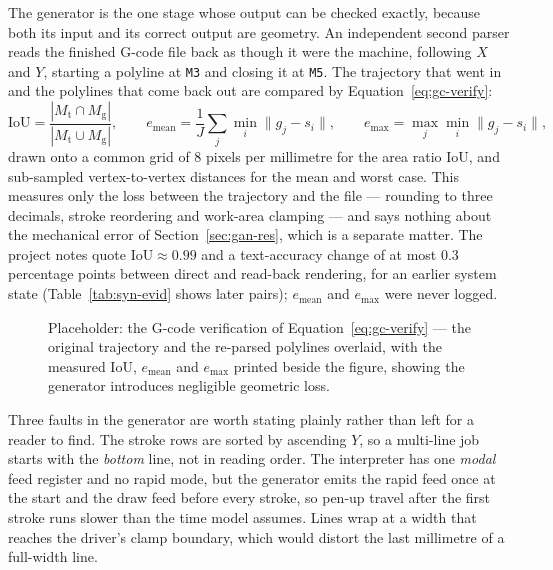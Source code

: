 \label{sec:gc-verify}
The generator is the one stage whose output can be checked exactly, because both its input and its correct output are geometry. An independent second parser reads the finished G-code file back as though it were the machine, following $X$ and $Y$, starting a polyline at \texttt{M3} and closing it at \texttt{M5}. The trajectory that went in and the polylines that come back out are compared by Equation~\ref{eq:gc-verify}:
\begin{equation}
\mathrm{IoU}=\frac{|M_{\mathrm t}\cap M_{\mathrm g}|}{|M_{\mathrm t}\cup M_{\mathrm g}|},\qquad e_{\mathrm{mean}}=\frac{1}{J}\sum_j\min_i\lVert g_j-s_i\rVert,\qquad e_{\max}=\max_j\min_i\lVert g_j-s_i\rVert,
\label{eq:gc-verify}
\end{equation}
drawn onto a common grid of 8 pixels per millimetre for the area ratio $\mathrm{IoU}$, and sub-sampled vertex-to-vertex distances for the mean and worst case. This measures only the loss between the trajectory and the file --- rounding to three decimals, stroke reordering and work-area clamping --- and says nothing about the mechanical error of Section~\ref{sec:gan-res}, which is a separate matter. The project notes quote $\mathrm{IoU}\approx0.99$ and a text-accuracy change of at most 0.3 percentage points between direct and read-back rendering, for an earlier system state (Table~\ref{tab:syn-evid} shows later pairs); $e_{\mathrm{mean}}$ and $e_{\max}$ were never logged.

\begin{figure}[htb]
\centering
{}
\captionsetup{singlelinecheck=false,justification=justified}
\caption{Placeholder: the G-code verification of Equation~\ref{eq:gc-verify} --- the original trajectory and the re-parsed polylines overlaid, with the measured $\mathrm{IoU}$, $e_{\mathrm{mean}}$ and $e_{\max}$ printed beside the figure, showing the generator introduces negligible geometric loss.}
\label{fig:gc-verify-fig}
\end{figure}

\label{sec:gc-faults}
Three faults in the generator are worth stating plainly rather than left for a reader to find. The stroke rows are sorted by ascending $Y$, so a multi-line job starts with the \emph{bottom} line, not in reading order. The interpreter has one \emph{modal} feed register and no rapid mode, but the generator emits the rapid feed once at the start and the draw feed before every stroke, so pen-up travel after the first stroke runs slower than the time model assumes. Lines wrap at a width that reaches the driver's clamp boundary, which would distort the last millimetre of a full-width line.


